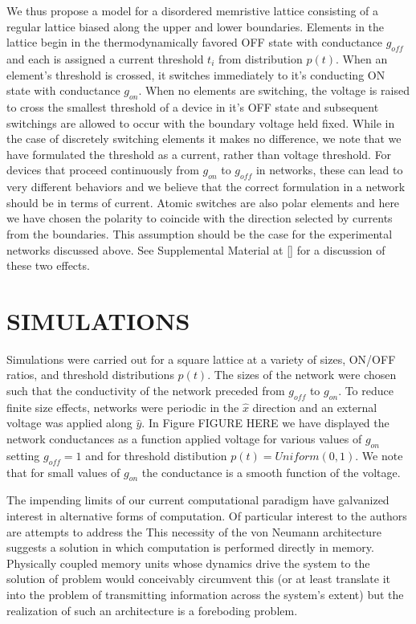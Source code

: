 \documentclass[aps,prl,preprint,groupedaddress]{revtex4-1}
\begin{document}
We thus propose a model for a disordered memristive lattice consisting of a
regular lattice biased along the upper and lower boundaries.  Elements in
the lattice begin in the thermodynamically favored OFF state with conductance
$g_{off}$ and each is assigned a current threshold $t_i$ from distribution
$p(t)$.  When an element's threshold is crossed, it switches immediately to
it's conducting ON state with conductance $g_{on}$.  When no elements are
switching, the voltage is raised to cross the smallest threshold of a device
in it's OFF state and subsequent switchings are allowed to occur with the
boundary voltage held fixed.  While in the case of discretely switching
elements it makes no difference, we note that we have formulated the threshold
as a current, rather than voltage threshold.  For devices that proceed
continuously from $g_{on}$ to $g_{off}$ in networks, these can lead to very
different behaviors and we believe that the correct formulation in a network
should be in terms of current.  Atomic switches are also polar elements and
here we have chosen the polarity to coincide with the direction selected by
currents from the boundaries.  This assumption should be the case for
the experimental networks discussed above.  See Supplemental Material at []
for a discussion of these two effects.

\section{SIMULATIONS}

Simulations were carried out for a square lattice at a variety of sizes,
ON/OFF ratios, and threshold distributions $p(t)$.  The sizes of the network
were chosen such that the conductivity of the network preceded from $g_{off}$
to $g_{on}$.  To reduce finite size effects, networks were periodic in the
$\hat{x}$ direction and an external voltage was applied along $\hat{y}$. In
Figure FIGURE HERE we have displayed the network conductances as a function
applied voltage for various values of $g_{on}$ setting $g_{off} = 1$ and for
threshold distibution $p(t) = Uniform(0,1)$.  We note that for small values
of $g_{on}$ the conductance is a smooth function of the voltage.  

The impending limits of our current computational paradigm have galvanized
interest in alternative forms of computation. Of particular interest to the
authors are attempts to address the 
This necessity of the von Neumann architecture suggests a solution in which
computation is performed directly in memory.  Physically coupled memory units
whose dynamics drive the system to the solution of problem
would conceivably circumvent this (or at least translate it into the
problem of transmitting information across the system's extent) but the
realization of such an architecture is a foreboding problem.
\end{document}
